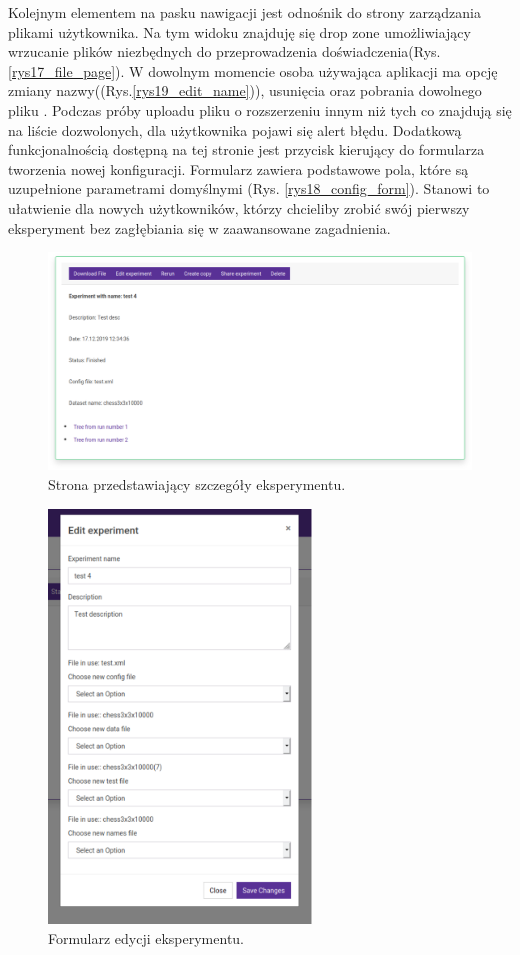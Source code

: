Kolejnym elementem na pasku nawigacji jest odnośnik do strony zarządzania plikami użytkownika. Na tym widoku znajduję się drop zone umożliwiający wrzucanie plików niezbędnych do przeprowadzenia doświadczenia(Rys.\ref{rys17_file_page}). W dowolnym momencie osoba używająca aplikacji ma opcję zmiany nazwy((Rys.\ref{rys19_edit_name})), usunięcia oraz pobrania dowolnego pliku . Podczas próby uploadu pliku o rozszerzeniu innym niż tych co znajdują się na liście dozwolonych, dla użytkownika pojawi się alert błędu. Dodatkową funkcjonalnością dostępną na tej stronie jest przycisk kierujący do formularza tworzenia nowej konfiguracji. Formularz zawiera podstawowe pola, które są uzupełnione parametrami domyślnymi (Rys. \ref{rys18_config_form}). Stanowi to ułatwienie dla nowych użytkowników, którzy chcieliby zrobić swój pierwszy eksperyment bez zagłębiania się w zaawansowane zagadnienia.


\begin{figure}[htb]
	\centering
	\includegraphics[width=15cm]{grafika/details_page.eps}
	\caption{Strona przedstawiający szczegóły eksperymentu.}
	\label{rys12_details_page}
\end{figure}

\begin{figure}[htb]
	\centering
	\includegraphics[height=11cm]{grafika/edit_experiment.eps}
	\caption{Formularz edycji eksperymentu.}
	\label{rys13_edit_experiment}
\end{figure}

